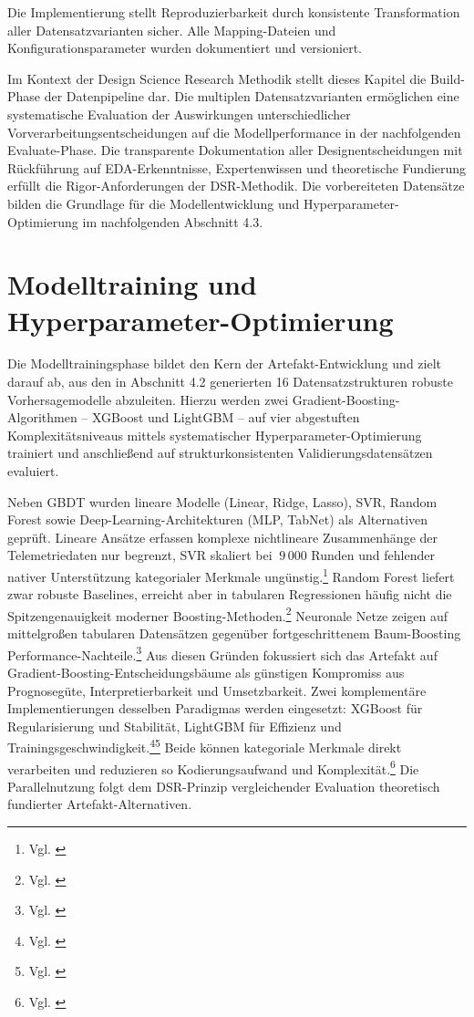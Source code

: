 Die Implementierung stellt Reproduzierbarkeit durch konsistente Transformation aller Datensatzvarianten sicher. Alle Mapping-Dateien und Konfigurationsparameter wurden dokumentiert und versioniert.

Im Kontext der Design Science Research Methodik stellt dieses Kapitel die Build-Phase der Datenpipeline dar. Die multiplen Datensatzvarianten ermöglichen eine systematische Evaluation der Auswirkungen unterschiedlicher Vorverarbeitungsentscheidungen auf die Modellperformance in der nachfolgenden Evaluate-Phase. Die transparente Dokumentation aller Designentscheidungen mit Rückführung auf EDA-Erkenntnisse, Expertenwissen und theoretische Fundierung erfüllt die Rigor-Anforderungen der DSR-Methodik.
Die vorbereiteten Datensätze bilden die Grundlage für die Modellentwicklung und Hyperparameter-Optimierung im nachfolgenden Abschnitt 4.3.



\section{Modelltraining und Hyperparameter-Optimierung}

Die Modelltrainingsphase bildet den Kern der Artefakt-Entwicklung und zielt darauf ab, aus den in Abschnitt 4.2 generierten 16 Datensatzstrukturen robuste Vorhersagemodelle abzuleiten. Hierzu werden zwei Gradient-Boosting-Algorithmen – XGBoost und LightGBM – auf vier abgestuften Komplexitätsniveaus mittels systematischer Hyperparameter-Optimierung trainiert und anschließend auf strukturkonsistenten Validierungsdatensätzen evaluiert.

Neben \ac{GBDT} wurden lineare Modelle (Linear, Ridge, Lasso), \ac{SVR}, Random Forest sowie Deep-Learning-Architekturen (MLP, TabNet) als Alternativen geprüft. Lineare Ansätze erfassen komplexe nichtlineare Zusammenhänge der Telemetriedaten nur begrenzt, \ac{SVR} skaliert bei \(~9\,000\) Runden und fehlender nativer Unterstützung kategorialer Merkmale ungünstig.\footnote{Vgl. \cite{Brown2021SVR}} Random Forest liefert zwar robuste Baselines, erreicht aber in tabularen Regressionen häufig nicht die Spitzengenauigkeit moderner Boosting-Methoden.\footnote{Vgl. \cite{Smith2022RFvGB}} Neuronale Netze zeigen auf mittelgroßen tabularen Datensätzen gegenüber fortgeschrittenem Baum-Boosting Performance-Nachteile.\footnote{Vgl. \cite{Jones2022NNvGBDT}} Aus diesen Gründen fokussiert sich das Artefakt auf Gradient-Boosting-Entscheidungsbäume als günstigen Kompromiss aus Prognosegüte, Interpretierbarkeit und Umsetzbarkeit.
Zwei komplementäre Implementierungen desselben Paradigmas werden eingesetzt: XGBoost für Regularisierung und Stabilität, LightGBM für Effizienz und Trainingsgeschwindigkeit.\footnote{Vgl. \cite{Chen2016XGBoost}}\footnote{Vgl. \cite{Ke2017LightGBM}} Beide können kategoriale Merkmale direkt verarbeiten und reduzieren so Kodierungsaufwand und Komplexität.\footnote{Vgl. \cite{Pedregosa2011ScikitLearn}} Die Parallelnutzung folgt dem DSR-Prinzip vergleichender Evaluation theoretisch fundierter Artefakt-Alternativen.

